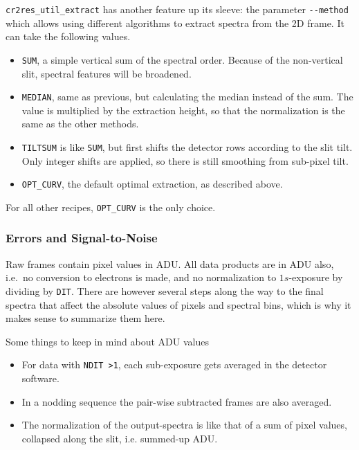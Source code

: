 \verb!cr2res_util_extract! has another feature up its sleeve: the parameter
\verb!--method! which allows using different algorithms to extract spectra from
the 2D frame. It can take the following values.
\begin{itemize}
    \item \verb!SUM!, a simple vertical sum of the spectral order. Because of
    the non-vertical slit, spectral features will be broadened.
    \item \verb!MEDIAN!, same as previous, but calculating the median instead of
    the sum. The value is multiplied by the extraction height, so that the
    normalization is the same as the other methods.
    \item \verb!TILTSUM! is like \verb!SUM!, but first shifts the detector rows
    according to the slit tilt. Only integer shifts are applied, so there is
    still smoothing from sub-pixel tilt.
    \item \verb!OPT_CURV!, the default optimal extraction, as described above.
\end{itemize}

For all other recipes, \verb!OPT_CURV! is the only choice.

\subsubsection{Errors and Signal-to-Noise}
\label{sec:errors}

Raw frames contain pixel values in ADU. All data products are in ADU also,
i.e.~no conversion to electrons is made, and no normalization to $1s$-exposure by
dividing by \verb!DIT!. There are however several steps along the way to the
final spectra that affect the absolute values of pixels and spectral bins, which
is why it makes sense to summarize them here.

Some things to keep in mind about ADU values
\begin{itemize}
    \item For data with \verb!NDIT >1!, each sub-exposure gets averaged in the
    detector software.
    \item In a nodding sequence the pair-wise subtracted frames are also
    averaged.
    \item The normalization of the output-spectra is like that of a sum of pixel
    values, collapsed along the slit, i.e. summed-up ADU.
\end{itemize}


